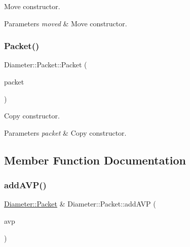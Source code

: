 Move constructor. 


\begin{DoxyParams}{Parameters}
{\em moved} & Move constructor. \\
\hline
\end{DoxyParams}
\mbox{\label{classDiameter_1_1Packet_aadcbaa0411cf902d5e9b9e592765c25e}} 
\subsubsection{\texorpdfstring{Packet()}{Packet()}\hspace{0.1cm}{\footnotesize\ttfamily [3/3]}}
{\footnotesize\ttfamily Diameter\+::\+Packet\+::\+Packet (\begin{DoxyParamCaption}\item[{const \hyperlink{classDiameter_1_1Packet}{Packet} \&}]{packet }\end{DoxyParamCaption})\hspace{0.3cm}{\ttfamily [default]}}



Copy constructor. 


\begin{DoxyParams}{Parameters}
{\em packet} & Copy constructor. \\
\hline
\end{DoxyParams}


\subsection{Member Function Documentation}
\mbox{\label{classDiameter_1_1Packet_a36d19bb1e2ff1517dea5927bd77cc7b9}} 
\subsubsection{\texorpdfstring{add\+A\+V\+P()}{addAVP()}}
{\footnotesize\ttfamily \hyperlink{classDiameter_1_1Packet}{Diameter\+::\+Packet} \& Diameter\+::\+Packet\+::add\+A\+VP (\begin{DoxyParamCaption}\item[{\hyperlink{classDiameter_1_1AVP}{Diameter\+::\+A\+VP}}]{avp }\end{DoxyParamCaption})}



